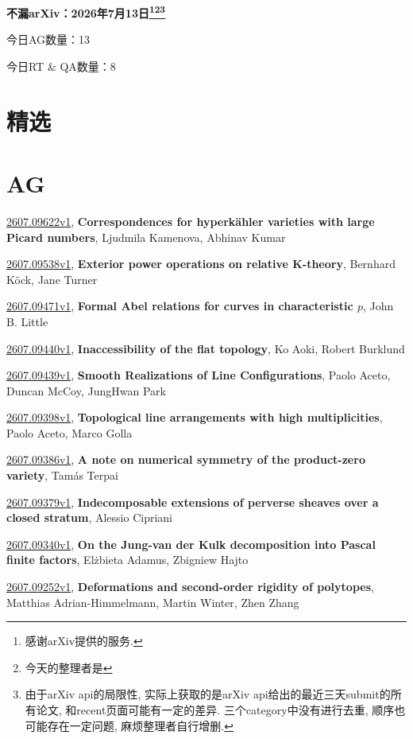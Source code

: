 \documentclass[9pt, a4paper]{article}
\theoremstyle{plain}
\theoremstyle{definition}
\theoremstyle{remark}
\newcommand{\arxiv}[3]{\href{https://arxiv.org/abs/#1}{#1}, \textbf{\textcolor{arxivblue}{#2}}, #3}
\newcommand{\AGnumber}{13}
\newcommand{\RTQAnumber}{8}
\newcommand{\NewestDate}{2026年7月13日}
\newcommand{\todayarXiver}{} %
\begin{document}
\begin{center}
    \Huge\textbf{不漏arXiv：\NewestDate\footnote{感谢arXiv提供的服务.}\footnote{今天的整理者是\todayarXiver}\footnote{由于arXiv api的局限性, 实际上获取的是arXiv api给出的最近三天submit的所有论文, 和recent页面可能有一定的差异. 三个category中没有进行去重, 顺序也可能存在一定问题, 麻烦整理者自行增删.}} \\
\end{center}

\setcounter{section}{-1}

\begin{center}
    今日AG数量：\AGnumber
    
    今日RT \& QA数量：\RTQAnumber
    
\end{center}


\section{精选}


\section{AG}
\arxiv{2607.09622v1}{Correspondences for hyperkähler varieties with large Picard numbers}{Ljudmila Kamenova, Abhinav Kumar}

\arxiv{2607.09538v1}{Exterior power operations on relative K-theory}{Bernhard Köck, Jane Turner}

\arxiv{2607.09471v1}{Formal Abel relations for curves in characteristic $p$}{John B. Little}

\arxiv{2607.09440v1}{Inaccessibility of the flat topology}{Ko Aoki, Robert Burklund}

\arxiv{2607.09439v1}{Smooth Realizations of Line Configurations}{Paolo Aceto, Duncan McCoy, JungHwan Park}

\arxiv{2607.09398v1}{Topological line arrangements with high multiplicities}{Paolo Aceto, Marco Golla}

\arxiv{2607.09386v1}{A note on numerical symmetry of the product-zero variety}{Tamás Terpai}

\arxiv{2607.09379v1}{Indecomposable extensions of perverse sheaves over a closed stratum}{Alessio Cipriani}

\arxiv{2607.09340v1}{On the Jung-van der Kulk decomposition into Pascal finite factors}{Elżbieta Adamus, Zbigniew Hajto}

\arxiv{2607.09252v1}{Deformations and second-order rigidity of polytopes}{Matthias Adrian-Himmelmann, Martin Winter, Zhen Zhang}
\end{document}
